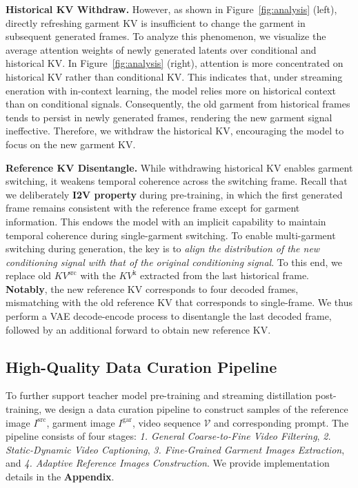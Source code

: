 \noindent
\textbf{Historical KV Withdraw.}
% 
However, as shown in Figure~\ref{fig:analysis} (left), directly refreshing garment KV is insufficient to change the garment in subsequent generated frames.
%
To analyze this phenomenon, we visualize the average attention weights of newly generated latents over conditional and historical KV. In Figure~\ref{fig:analysis} (right), attention is more concentrated on historical KV rather than conditional KV.
This indicates that, under streaming eneration with in-context learning, the model relies more on historical context than on conditional signals.
Consequently, the old garment from historical frames tends to persist in newly generated frames, rendering the new garment signal ineffective.
%
Therefore, we withdraw the historical KV, encouraging the model to focus on the new garment KV.



\noindent
\textbf{Reference KV Disentangle.}
%
While withdrawing historical KV enables garment switching, it weakens temporal coherence across the switching frame.
% 
Recall that we deliberately \textbf{I2V property} during pre-training, in which the first generated frame remains consistent with the reference frame except for garment information. This endows the model with an implicit capability to maintain temporal coherence during single-garment switching.
% 
To enable multi-garment switching during generation, the key is to \textit{align the distribution of the new conditioning signal with that of the original conditioning signal}.
% 
To this end, we replace old $KV^{\text{src}}$ with the $KV^{\text{k}}$ extracted from the last historical frame.
% 
\textbf{Notably}, the new reference KV corresponds to four decoded frames, mismatching with the old reference KV that corresponds to single-frame.
We thus perform a VAE decode-encode process to disentangle the last decoded frame, followed by an additional forward to obtain new reference KV.





\subsection{High-Quality Data Curation Pipeline}
\label{sec:3-4}
%
To further support teacher model pre-training and streaming distillation post-training, we design a data curation pipeline to construct samples of the reference image $I^{\text{src}}$, garment image $I^{\text{gar}}$, video sequence $\mathcal{V}$ and corresponding prompt.
The pipeline consists of four stages: \textit{1. General Coarse-to-Fine Video Filtering}, \textit{2. Static-Dynamic Video Captioning}, \textit{3. Fine-Grained Garment Images Extraction}, and \textit{4. Adaptive Reference Images Construction}.
We provide implementation details in the \textbf{Appendix}.
